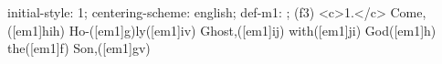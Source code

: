 initial-style: 1;
centering-scheme: english;
def-m1: \grealign;
(f3) <c>1.</c> Come,([em1]hih) Ho-([em1]g)ly([em1]iv) Ghost,([em1]ij) with([em1]ji) God([em1]h) the([em1]f) Son,([em1]gv)